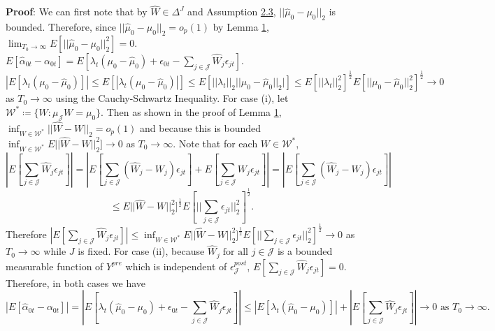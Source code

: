 \documentclass{article}
\begin{document}
\textbf{Proof}: We can first note that by $\hat{W} \in \Delta^J$ and Assumption \hyperref[A2]{2.3},  $||\hat{\mu}_0 - \mu_0||_2$ is bounded. Therefore, since $||\hat{\mu}_0 - \mu_0||_2 = o_p(1)$ by Lemma \hyperref[L1]{1}, $\lim_{T_0 \rightarrow \infty} E[||\hat{\mu}_0 - \mu_0||_2^2] = 0$. $E[\hat{\alpha}_{0t} - \alpha_{0t}] = E[\lambda_t (\mu_0 -  \hat{\mu}_0) + \epsilon_{0t} - \sum_{j \in \mathcal{J}} \hat{W}_j \epsilon_{jt}]$.  $|E[\lambda_t (\mu_0 - \hat{\mu}_0)]| \leq E[|\lambda_t (\mu_0 - \hat{\mu}_0)|] \leq E[||\lambda_t||_2 ||\mu_0 - \hat{\mu}_0||_2|] \leq E[||\lambda_t||_2^2]^{\frac{1}{2}}  E[||\mu_0 - \hat{\mu}_0||_2^2]^{\frac{1}{2}} \rightarrow 0$ as $T_0 \rightarrow \infty$ using the Cauchy-Schwartz Inequality. For case (i), let $\mathcal{W}^* \coloneqq \{W : \mu_{\mathcal{J}}W = \mu_0\}$. Then as shown in the proof of Lemma \hyperref[L1]{1}, $\inf_{W \in \mathcal{W}^*} ||\hat{W} - W||_2 = o_p(1)$ and because this is bounded $\inf_{W \in \mathcal{W}^*} E||\hat{W} - W||_2^2] \rightarrow 0$ as $T_0 \rightarrow \infty$. Note that for each $W \in \mathcal{W}^*$,
\begin{equation*}
   | E[\sum_{j \in \mathcal{J}} \hat{W}_j \epsilon_{jt}]| = |E[\sum_{j \in \mathcal{J}} (\hat{W}_j - W_j)\epsilon_{jt}] + E[\sum_{j \in \mathcal{J}} W_j \epsilon_{jt}]| = |E[\sum_{j \in \mathcal{J}} (\hat{W}_j - W_j)\epsilon_{jt}]|
\end{equation*}
\begin{equation*}
    \leq E||\hat{W} - W||_2^2]^{\frac{1}{2}} E[||\sum_{j \in \mathcal{J}} \epsilon_{jt}||_2^2]^{\frac{1}{2}}.
\end{equation*}
Therefore $| E[\sum_{j \in \mathcal{J}} \hat{W}_j \epsilon_{jt}]| \leq \inf_{W \in \mathcal{W^*}} E||\hat{W} - W||_2^2]^{\frac{1}{2}} E[||\sum_{j \in \mathcal{J}} \epsilon_{jt}||_2^2]^{\frac{1}{2}} \rightarrow 0$ as $T_0 \rightarrow \infty$ while $J$ is fixed. For case (ii), because $\hat{W}_j \; \text{for all } j \in \mathcal{J}$ is a bounded measurable function of $Y^{pre}$ which is independent of $\epsilon_{\mathcal{J}}^{post}$, $E[\sum_{j \in \mathcal{J}} \hat{W}_j \epsilon_{jt}] = 0$. Therefore, in both cases we have 
\begin{equation*}
    |E[\hat{\alpha}_{0t} - \alpha_{0t}]| = |E[\lambda_t (\hat{\mu}_0 - \mu_0) + \epsilon_{0t} - \sum_{j \in \mathcal{J}} \hat{W}_j \epsilon_{jt}]| \leq |E[\lambda_t (\hat{\mu}_0 - \mu_0)]| + |E[\sum_{j \in \mathcal{J}} \hat{W}_j \epsilon_{jt}]| \rightarrow 0 \text{ as } T_0 \rightarrow \infty.
\end{equation*}
\end{document}
